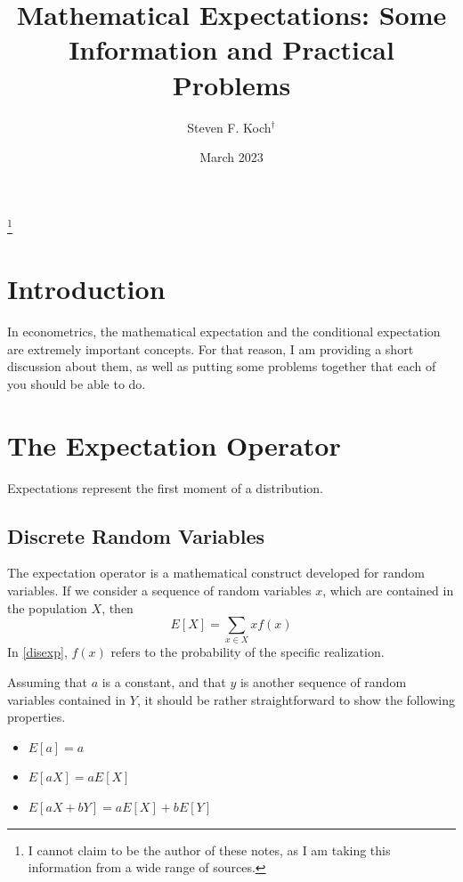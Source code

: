 \documentclass[]{amsart}
\begin{document}
\title[Dealing with Expections]{Mathematical Expectations: Some
  Information and Practical Problems}

\thanks{I cannot claim to be the author of these notes, as I am taking
this information from a wide range of sources.}  

\author{Steven F. Koch$^\dag$}






\date{March 2023}
\maketitle

\section{Introduction}
In econometrics, the mathematical expectation and the conditional
expectation are extremely important concepts. For that reason, I am
providing a short discussion about them, as well as putting some
problems together that each of you should be able to do.

\section{The Expectation Operator}
Expectations represent the first moment of a distribution.

\subsection{Discrete Random Variables}
The expectation operator is a mathematical construct developed for
random variables. If we consider a sequence of random variables $x$,
which are contained in the population $X$, then 
\begin{equation}\label{disexp}
E[X] = \sum_{x\in X} xf(x)
\end{equation}
In \eqref{disexp}, $f(x)$ refers to the probability of the specific realization.

Assuming that $a$ is a constant, and that $y$ is another sequence of
random variables contained in $Y$, it should be rather straightforward
to show the following properties.
\begin{itemize}
\item $E[a] = a$
\item $E[aX] = aE[X]$
\item $E[aX + bY] = aE[X] + bE[Y]$
\end{itemize} 
\end{document}
